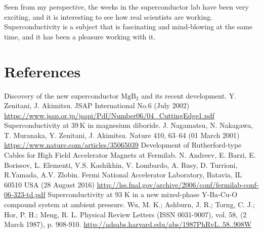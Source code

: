 \documentclass{comjnl}
\newcommand*\chem[1]{\ensuremath{\mathrm{#1}}}
\begin{document}
Seen from my perspective, the weeks in the superconductor lab have been very exciting, and it is interesting to see how real scientists are working. Superconductivity is a subject that is fascinating and mind-blowing at the same time, and it has been a pleasure working with it.

\section{References}
\begingroup
\renewcommand{\section}[2]{}
\begin{thebibliography}{}
  Discovery of the new superconductor \chem{MgB_2} and its recent development. 
  Y. Zenitani, J. Akimitsu. 
  JSAP International No.6 (July 2002)
  \url{https://www.jsap.or.jp/jsapi/Pdf/Number06/04_CuttingEdge1.pdf}
  Superconductivity at 39 K in magnesium diboride. 
  J. Nagamatsu, N. Nakagawa, T. Muranaka, Y. Zenitani, J. Akimitsu. 
  Nature 410, 63–64 (01 March 2001)
  \url{https://www.nature.com/articles/35065039}
  Development of Rutherford-type Cables for High Field Accelerator Magnets at Fermilab.
  N. Andreev, E. Barzi, E. Borissov, L. Elementi, V.S. Kashikhin, V. Lombardo, A. Rusy, D. Turrioni, 
R.Yamada, A.V. Zlobin.
   Fermi  National  Accelerator  Laboratory,  Batavia, IL 60510 USA (28 August 2016)
  \url{http://lss.fnal.gov/archive/2006/conf/fermilab-conf-06-323-td.pdf}
  Superconductivity at 93 K in a new mixed-phase Y-Ba-Cu-O compound system at ambient pressure.
  Wu, M. K.; Ashburn, J. R.; Torng, C. J.; Hor, P. H.; Meng, R. L.
  Physical Review Letters (ISSN 0031-9007), vol. 58, (2 March 1987), p. 908-910.
  \url{http://adsabs.harvard.edu/abs/1987PhRvL..58..908W}
\end{thebibliography}
\endgroup
\nocite{*}



\end{document}
